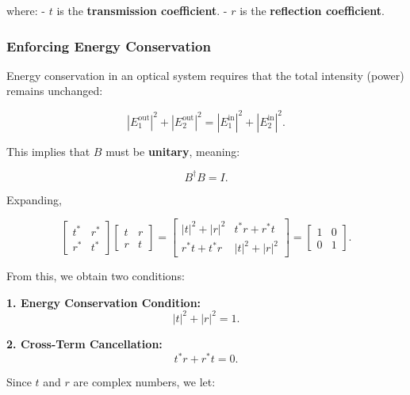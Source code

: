 \documentclass[a4paper,12pt]{article}
\begin{document}
where:
- \( t \) is the \textbf{transmission coefficient}.
- \( r \) is the \textbf{reflection coefficient}.

\subsubsection{\textbf{Enforcing Energy Conservation}}
Energy conservation in an optical system requires that the total intensity (power) remains unchanged:

\begin{equation}
    |E_1^{\text{out}}|^2 + |E_2^{\text{out}}|^2 = |E_1^{\text{in}}|^2 + |E_2^{\text{in}}|^2.
\end{equation}

This implies that \( B \) must be \textbf{unitary}, meaning:

\begin{equation}
    B^\dagger B = I.
\end{equation}

Expanding,

\begin{equation}
\begin{bmatrix}
    t^* & r^* \\
    r^* & t^*
\end{bmatrix}
\begin{bmatrix}
    t & r \\
    r & t
\end{bmatrix}
=
\begin{bmatrix}
    |t|^2 + |r|^2 & t^* r + r^* t \\
    r^* t + t^* r & |t|^2 + |r|^2
\end{bmatrix}
=
\begin{bmatrix}
    1 & 0 \\
    0 & 1
\end{bmatrix}.
\end{equation}

From this, we obtain two conditions:

\textbf{1. Energy Conservation Condition:}
   \begin{equation}
   |t|^2 + |r|^2 = 1.
   \end{equation}

\textbf{2. Cross-Term Cancellation:}
   \begin{equation}
   t^* r + r^* t = 0.
   \end{equation}

Since \( t \) and \( r \) are complex numbers, we let:
\end{document}
